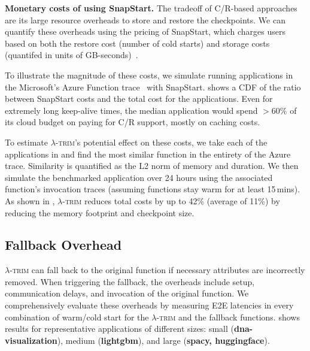 \documentclass[sigplan,screen]{acmart}
\newcommand{\sys}{\textsc{\ensuremath{\lambda}-trim}\xspace}
\newcommand{\heading}[1]{\vspace{4pt}\noindent\textbf{#1.}}
\newcommand{\application}[1]{{\textcolor{pennblue}{\textbf{#1}}}}
\begin{document}
\heading{\boldmath Monetary costs of using SnapStart}
The tradeoff of C/R-based approaches are its large resource overheads to store and restore the checkpoints.
We can quantify these overheads using the pricing of SnapStart, which charges users based on both the restore cost (number of cold starts) and storage costs (quantifed in units of GB-seconds)~\cite{sspricing}.

To illustrate the magnitude of these costs, we simulate running applications in the Microsoft's Azure Function trace~\cite{wild2020} with SnapStart.
 shows a CDF of the ratio between SnapStart costs and the total cost for the applications.
Even for extremely long keep-alive times, the median application would spend $>$60\% of its cloud budget on paying for C/R support, mostly on caching costs.



To estimate \sys's potential effect on these costs, we take each of the applications in  and find the most similar function in the entirety of the Azure trace.
Similarity is quantified as the L2 norm of memory and duration.
We then simulate the benchmarked application over 24 hours using the associated function's invocation traces (assuming functions stay warm for at least 15\,mins).
As shown in , \sys reduces total costs by up to 42\% (average of 11\%) by reducing the memory footprint and checkpoint size.










 

\vspace{-2pt}

\subsection{Fallback Overhead}\label{sec:fallback-overhead}
\sys can fall back to the original function if necessary attributes are incorrectly removed.
When triggering the fallback, the overheads include setup, communication delays, and invocation of the original function.
We comprehensively evaluate these overheads by measuring E2E latencies in every combination of warm/cold start for the \sys and the fallback functions.
 shows results for representative applications of different sizes: small (\application{dna-visualization}), medium (\application{lightgbm}), and large (\application{spacy, huggingface}).
\end{document}
